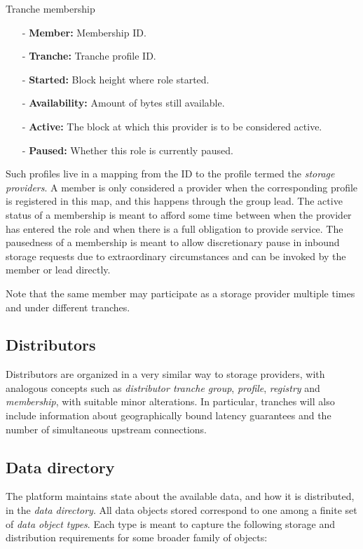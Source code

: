 \documentclass{article}
\newenvironment{concept_box}[1]
    {
    \begin{tcolorbox}
    {\large \textbf{#1} }
    }
    {
    \end{tcolorbox}
    }
\begin{document}
\begin{concept_box}{Tranche membership}
    \begin{itemize}
      \item[-] \textbf{Member:} Membership ID.
      \item[-] \textbf{Tranche:} Tranche profile ID.
      \item[-] \textbf{Started:} Block height where role started.
      \item[-] \textbf{Availability:} Amount of bytes still available.
      \item[-] \textbf{Active:} The block at which this provider is to be considered active.
      \item[-] \textbf{Paused:} Whether this role is currently paused.
    \end{itemize}
\end{concept_box}

Such profiles live in a mapping from the ID to the profile termed the \textit{storage providers}. A member is only considered a provider when the corresponding profile is registered in this map, and this happens through the group lead. The active status of a membership is meant to afford some time between when the provider has entered the role and when there is a full obligation to provide service. The pausedness of a membership is meant to allow discretionary pause in inbound storage requests due to extraordinary circumstances and can be invoked by the member or lead directly.

Note that the same member may participate as a storage provider multiple times and under different tranches.

\subsection{Distributors}

Distributors are organized in a very similar way to storage providers, with analogous concepts such as \textit{distributor tranche group}, \textit{profile},  \textit{registry} and \textit{membership}, with suitable minor alterations. In particular, tranches will also include information about geographically bound latency guarantees and the number of simultaneous upstream connections.

\subsection{Data directory}

The platform maintains state about the available data, and how it is distributed, in the \textit{data directory}. All data objects stored correspond to one among a finite set of \textit{data object types}. Each type is meant to capture the following storage and distribution requirements for some broader family of objects:
\end{document}
